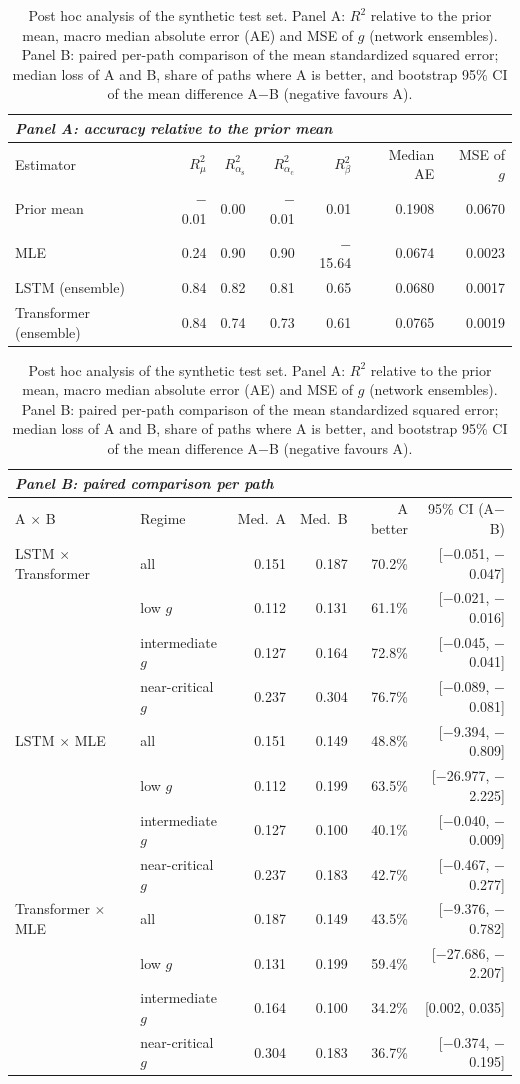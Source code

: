 \documentclass[preprint,12pt,authoryear]{elsarticle}
\newcommand{\aself}{\alpha_{\mathrm{s}}}
\newcommand{\across}{\alpha_{\mathrm{c}}}
\begin{document}
\begin{table}[t]
\centering
\caption{Post hoc analysis of the synthetic test set. Panel A: $R^2$ relative to the prior
mean, macro median absolute error (AE) and MSE of $g$ (network ensembles). Panel B: paired
per-path comparison of the mean standardized squared error; median loss of A and B, share
of paths where A is better, and bootstrap 95\% CI of the mean difference A$-$B (negative
favours A).}
\label{tab:posthoc}
\footnotesize
\setlength{\tabcolsep}{5pt}
\begin{tabular}{lrrrrrr}
\multicolumn{7}{l}{\emph{Panel A: accuracy relative to the prior mean}}\\
\toprule
Estimator & $R^2_\mu$ & $R^2_{\aself}$ & $R^2_{\across}$ & $R^2_\beta$ & Median AE & MSE of $g$\\
\midrule
Prior mean & $-$0.01 & 0.00 & $-$0.01 & 0.01 & 0.1908 & 0.0670\\
MLE & 0.24 & 0.90 & 0.90 & $-$15.64 & 0.0674 & 0.0023\\
LSTM (ensemble) & 0.84 & 0.82 & 0.81 & 0.65 & 0.0680 & 0.0017\\
Transformer (ensemble) & 0.84 & 0.74 & 0.73 & 0.61 & 0.0765 & 0.0019\\
\bottomrule
\end{tabular}

\vspace{1.2ex}
\begin{tabular}{llrrrr}
\multicolumn{6}{l}{\emph{Panel B: paired comparison per path}}\\
\toprule
A $\times$ B & Regime & Med.\ A & Med.\ B & A better & 95\% CI (A$-$B)\\
\midrule
LSTM $\times$ Transformer & all & 0.151 & 0.187 & 70.2\% & [$-$0.051, $-$0.047]\\
 & low $g$ & 0.112 & 0.131 & 61.1\% & [$-$0.021, $-$0.016]\\
 & intermediate $g$ & 0.127 & 0.164 & 72.8\% & [$-$0.045, $-$0.041]\\
 & near-critical $g$ & 0.237 & 0.304 & 76.7\% & [$-$0.089, $-$0.081]\\
\midrule
LSTM $\times$ MLE & all & 0.151 & 0.149 & 48.8\% & [$-$9.394, $-$0.809]\\
 & low $g$ & 0.112 & 0.199 & 63.5\% & [$-$26.977, $-$2.225]\\
 & intermediate $g$ & 0.127 & 0.100 & 40.1\% & [$-$0.040, $-$0.009]\\
 & near-critical $g$ & 0.237 & 0.183 & 42.7\% & [$-$0.467, $-$0.277]\\
\midrule
Transformer $\times$ MLE & all & 0.187 & 0.149 & 43.5\% & [$-$9.376, $-$0.782]\\
 & low $g$ & 0.131 & 0.199 & 59.4\% & [$-$27.686, $-$2.207]\\
 & intermediate $g$ & 0.164 & 0.100 & 34.2\% & [0.002, 0.035]\\
 & near-critical $g$ & 0.304 & 0.183 & 36.7\% & [$-$0.374, $-$0.195]\\
\bottomrule
\end{tabular}
\end{table}
\end{document}
